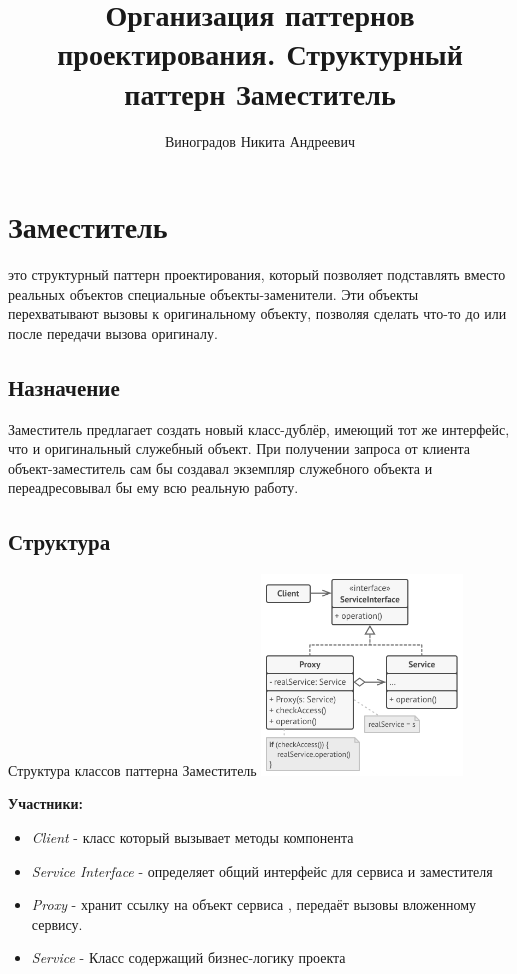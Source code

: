 \documentclass[PI,LAB]{HSEUniversity}
\title{Организация паттернов проектирования. Структурный паттерн Заместитель}
\author{Виноградов Никита Андреевич}
\begin{document}
    \maketitle



    \chapter{Заместитель}
      это структурный паттерн проектирования, который позволяет подставлять вместо реальных объектов специальные объекты-заменители. Эти объекты перехватывают вызовы к оригинальному объекту, позволяя сделать что-то до или после передачи вызова оригиналу.
    \section{Назначение}
    Заместитель предлагает создать новый класс-дублёр, имеющий тот же интерфейс, что и оригинальный служебный объект. При получении запроса от клиента объект-заместитель сам бы создавал экземпляр служебного объекта и переадресовывал бы ему всю реальную работу.
    \section{Структура}

    \begin{FIGURE}[h]{Структура классов паттерна Заместитель\label{fig:example-figure}}
       \includegraphics[width=0.4\textwidth]{../out/diagrams/structure-ru}
    \end{FIGURE}

    \textbf{Участники:}
   		\begin{itemize}
   			\item \emph{Client} - класс который вызывает методы компонента
   		\item \emph{Service Interface} - определяет общий интерфейс для сервиса и заместителя
   		\item \emph{Proxy} -  хранит ссылку на объект сервиса ,  передаёт вызовы вложенному сервису.
   		\item \emph{Service} - Класс содержащий бизнес-логику проекта
   		\end{itemize}
\end{document}
